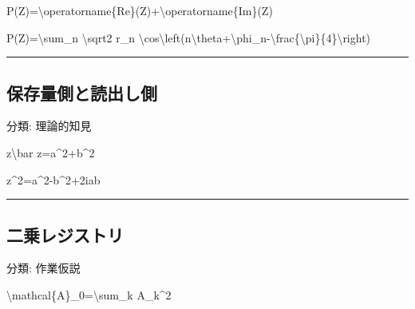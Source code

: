 \documentclass[
  a4paper,
]{ltjsarticle}
\newenvironment{Shaded}{}{}
\newcommand{\NormalTok}[1]{#1}
\begin{document}
\begin{Shaded}
\begin{Highlighting}[]
\NormalTok{P(Z)=\textbackslash{}operatorname\{Re\}(Z)+\textbackslash{}operatorname\{Im\}(Z)}
\end{Highlighting}
\end{Shaded}

\begin{Shaded}
\begin{Highlighting}[]
\NormalTok{P(Z)=\textbackslash{}sum\_n \textbackslash{}sqrt2 r\_n}
\NormalTok{\textbackslash{}cos\textbackslash{}left(n\textbackslash{}theta+\textbackslash{}phi\_n{-}\textbackslash{}frac\{\textbackslash{}pi\}\{4\}\textbackslash{}right)}
\end{Highlighting}
\end{Shaded}

\begin{center}\rule{0.5\linewidth}{0.5pt}\end{center}

\subsection{保存量側と読出し側}\label{ux4fddux5b58ux91cfux5074ux3068ux8aadux51faux3057ux5074}

分類: 理論的知見

\begin{Shaded}
\begin{Highlighting}[]
\NormalTok{z\textbackslash{}bar z=a\^{}2+b\^{}2}
\end{Highlighting}
\end{Shaded}

\begin{Shaded}
\begin{Highlighting}[]
\NormalTok{z\^{}2=a\^{}2{-}b\^{}2+2iab}
\end{Highlighting}
\end{Shaded}

\begin{center}\rule{0.5\linewidth}{0.5pt}\end{center}

\subsection{二乗レジストリ}\label{ux4e8cux4e57ux30ecux30b8ux30b9ux30c8ux30ea}

分類: 作業仮説

\begin{Shaded}
\begin{Highlighting}[]
\NormalTok{\textbackslash{}mathcal\{A\}\_0=\textbackslash{}sum\_k A\_k\^{}2}
\end{Highlighting}
\end{Shaded}
\end{document}
